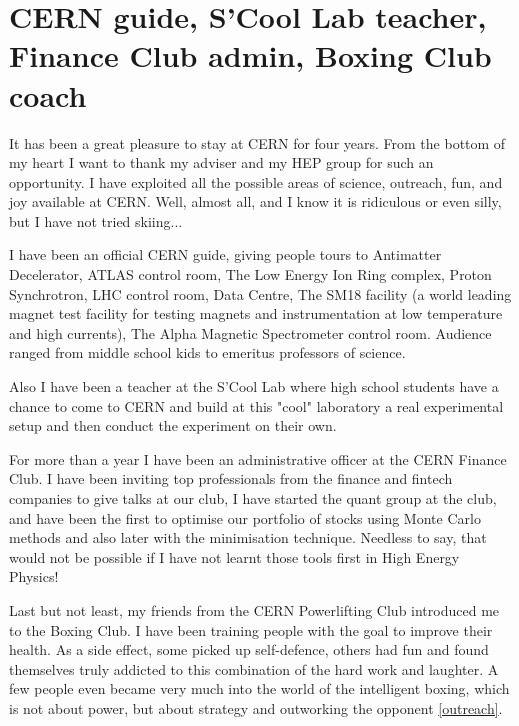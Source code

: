 \clearpage

\iffalse
\section*{CERN guide, S'Cool Lab teacher, Finance Club admin, Boxing Club coach}
\small

It has been a great pleasure to stay at CERN for four years. From the bottom of my heart I want to thank my adviser and my HEP group for such an opportunity. I have exploited all the possible areas of science, outreach, fun, and joy available at CERN. Well, almost all, and I know it is ridiculous or even silly, but I have not tried skiing...

I have been an official CERN guide, giving people tours to Antimatter Decelerator, ATLAS control room, The Low Energy Ion Ring complex, Proton Synchrotron, LHC control room, Data Centre, The SM18 facility (a world leading magnet test facility for testing magnets and instrumentation at low temperature and high currents), The Alpha Magnetic Spectrometer control room. Audience ranged from middle school kids to emeritus professors of science. 

Also I have been a teacher at the S'Cool Lab where high school students have a chance to come to CERN and build at this "cool" laboratory a real experimental setup and then conduct the experiment on their own. 

For more than a year I have been an administrative officer at the CERN Finance Club. I have been inviting top professionals from the finance and fintech companies to give talks at our club, I have started the quant group at the club, and have been the first to optimise our portfolio of stocks using Monte Carlo methods and also later with the minimisation technique. Needless to say, that would not be possible if I have not learnt those tools first in High Energy Physics!

Last but not least, my friends from the CERN Powerlifting Club introduced me to the Boxing Club. I have been training people with the goal to improve their health. As a side effect, some picked up self-defence, others had fun and found themselves truly addicted to this combination of the hard work and laughter. A few people even became very much into the world of the intelligent boxing, which is not about power, but about strategy and outworking the opponent \ref{outreach}. 



